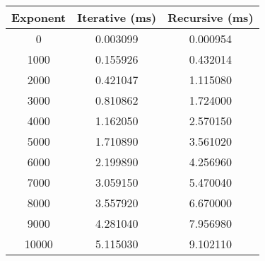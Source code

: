\begin{tabularx}{\textwidth}{c||c|c}
Exponent  &  Iterative (ms) &  Recursive (ms) \\
\hline
0      &  0.003099  &  0.000954 \\
1000   &  0.155926  &  0.432014 \\
2000   &  0.421047  &  1.115080 \\
3000   &  0.810862  &  1.724000 \\
4000   &  1.162050  &  2.570150 \\
5000   &  1.710890  &  3.561020 \\
6000   &  2.199890  &  4.256960 \\
7000   &  3.059150  &  5.470040 \\
8000   &  3.557920  &  6.670000 \\
9000   &  4.281040  &  7.956980 \\
10000  &  5.115030  &  9.102110 \\
\end{tabularx}